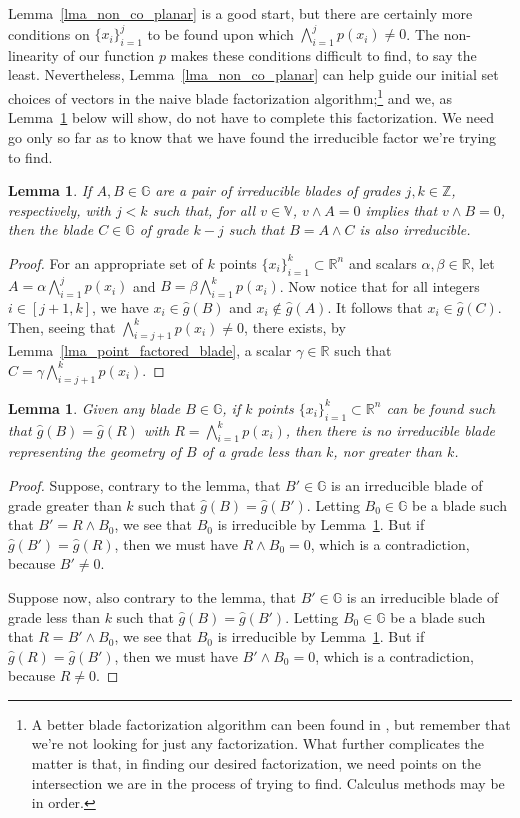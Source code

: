 \documentclass{birkjour}
\newtheorem{lem}[thm]{Lemma}
\theoremstyle{definition}
\theoremstyle{remark}
\numberwithin{equation}{section}
\newcommand{\R}{\mathbb{R}}
\newcommand{\G}{\mathbb{G}}
\newcommand{\V}{\mathbb{V}}
\newcommand{\Z}{\mathbb{Z}}
\newcommand{\gh}{\hat{g}}
\begin{document}
Lemma~\ref{lma_non_co_planar} is a good start, but there are certainly more conditions on $\{x_i\}_{i=1}^j$ to be found upon which
$\bigwedge_{i=1}^j p(x_i)\neq 0$.  The non-linearity of our function $p$ makes these conditions difficult to find, to say the least.
Nevertheless, Lemma~\ref{lma_non_co_planar} can help guide our initial set choices of vectors in the naive blade factorization
algorithm;\footnote{A better blade factorization algorithm can been found in \cite{}, but remember that we're not looking
for just any factorization.  What further complicates the matter is that, in finding our desired factorization, we need points on
the intersection we are in the process of trying to find.  Calculus methods may be in order.} and we, as
Lemma~\ref{lma_unique_grade_of_irreducible_form} below will show,
do not have to complete this factorization.  We need go only so far as to know
that we have found the irreducible factor we're trying to find.

\begin{lem}\label{lma_irreducibles_factor_as_irreducibles}
If $A,B\in\G$ are a pair of irreducible blades of grades $j,k\in\Z$, respectively, with $j<k$ such that,
for all $v\in\V$, $v\wedge A=0$ implies that $v\wedge B=0$, then the
blade $C\in\G$ of grade $k-j$ such that $B=A\wedge C$ is
also irreducible.
\end{lem}
\begin{proof}
For an appropriate set of $k$ points $\{x_i\}_{i=1}^k\subset\R^n$ and scalars $\alpha,\beta\in\R$,
let $A=\alpha\bigwedge_{i=1}^j p(x_i)$ and $B=\beta\bigwedge_{i=1}^k p(x_i)$.
Now notice that for all integers $i\in[j+1,k]$, we have $x_i\in\gh(B)$ and $x_i\not\in\gh(A)$.
It follows that $x_i\in\gh(C)$.  Then, seeing that $\bigwedge_{i=j+1}^k p(x_i)\neq 0$,
there exists, by Lemma~\ref{lma_point_factored_blade},  a scalar $\gamma\in\R$ such
that $C=\gamma\bigwedge_{i=j+1}^k p(x_i)$.
\end{proof}

\begin{lem}\label{lma_unique_grade_of_irreducible_form}
Given any blade $B\in\G$, if $k$ points $\{x_i\}_{i=1}^k\subset\R^n$ can be found
such that $\gh(B)=\gh(R)$ with $R=\bigwedge_{i=1}^k p(x_i)$, then there is no
irreducible blade representing the geometry of $B$ of a grade less than $k$, nor greater than $k$.
\end{lem}
\begin{proof}
Suppose, contrary to the lemma, that $B'\in\G$ is an irreducible blade of grade greater than $k$ such that $\gh(B)=\gh(B')$.
Letting $B_0\in\G$ be a blade such that $B'=R\wedge B_0$, we see that $B_0$ is irreducible
by Lemma~\ref{lma_irreducibles_factor_as_irreducibles}.  But if $\gh(B')=\gh(R)$, then
we must have $R\wedge B_0=0$, which is a contradiction, because $B'\neq 0$.

Suppose now, also contrary to the lemma, that $B'\in\G$ is an irreducible blade of grade less than $k$ such that $\gh(B)=\gh(B')$.
Letting $B_0\in\G$ be a blade such that $R=B'\wedge B_0$, we see that $B_0$ is irreducible
by Lemma~\ref{lma_irreducibles_factor_as_irreducibles}.  But if $\gh(R)=\gh(B')$, then
we must have $B'\wedge B_0=0$, which is a contradiction, because $R\neq 0$.
\end{proof}
\end{document}

